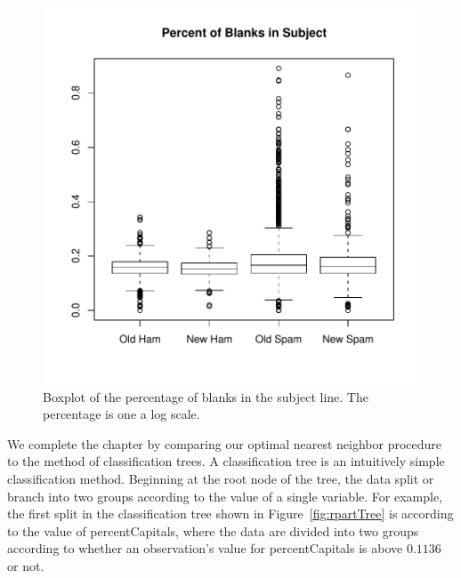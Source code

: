 \begin{figure}
\includegraphics{Spam/knnBoxPlotPSB.pdf}
\caption{Boxplot of the percentage of blanks in the subject line.
The percentage is one a log scale.}
\label{fig:knnBoxPlotPSB}
\end{figure}


We complete the chapter by comparing our optimal nearest neighbor 
procedure to the method of classification trees.
A classification tree is an intuitively simple classification
method. Beginning at the root node of the tree, the data
split or branch into two groups according to the
value of a single variable.
For example, the first split in the classification tree shown in
Figure~\ref{fig:rpartTree} is according to the value of 
percentCapitals, where the data are divided into two groups
according to whether an observation's value for percentCapitals is
above $0.1136$ or not. 

